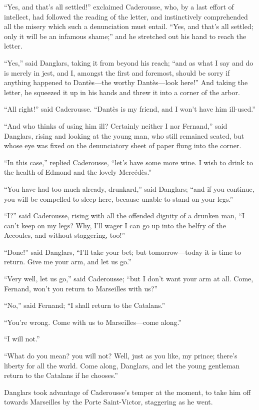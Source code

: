 “Yes, and that’s all settled!” exclaimed Caderousse, who, by a last
effort of intellect, had followed the reading of the letter, and
instinctively comprehended all the misery which such a denunciation
must entail. “Yes, and that’s all settled; only it will be an infamous
shame;” and he stretched out his hand to reach the letter.

“Yes,” said Danglars, taking it from beyond his reach; “and as what I
say and do is merely in jest, and I, amongst the first and foremost,
should be sorry if anything happened to Dantès—the worthy Dantès—look
here!” And taking the letter, he squeezed it up in his hands and threw
it into a corner of the arbor.

“All right!” said Caderousse. “Dantès is my friend, and I won’t have
him ill-used.”

“And who thinks of using him ill? Certainly neither I nor Fernand,”
said Danglars, rising and looking at the young man, who still remained
seated, but whose eye was fixed on the denunciatory sheet of paper
flung into the corner.

“In this case,” replied Caderousse, “let’s have some more wine. I wish
to drink to the health of Edmond and the lovely Mercédès.”

“You have had too much already, drunkard,” said Danglars; “and if you
continue, you will be compelled to sleep here, because unable to stand
on your legs.”

“I?” said Caderousse, rising with all the offended dignity of a drunken
man, “I can’t keep on my legs? Why, I’ll wager I can go up into the
belfry of the Accoules, and without staggering, too!”

“Done!” said Danglars, “I’ll take your bet; but tomorrow—today it is
time to return. Give me your arm, and let us go.”

“Very well, let us go,” said Caderousse; “but I don’t want your arm at
all. Come, Fernand, won’t you return to Marseilles with us?”

“No,” said Fernand; “I shall return to the Catalans.”

“You’re wrong. Come with us to Marseilles—come along.”

“I will not.”

“What do you mean? you will not? Well, just as you like, my prince;
there’s liberty for all the world. Come along, Danglars, and let the
young gentleman return to the Catalans if he chooses.”

Danglars took advantage of Caderousse’s temper at the moment, to take
him off towards Marseilles by the Porte Saint-Victor, staggering as he
went.

